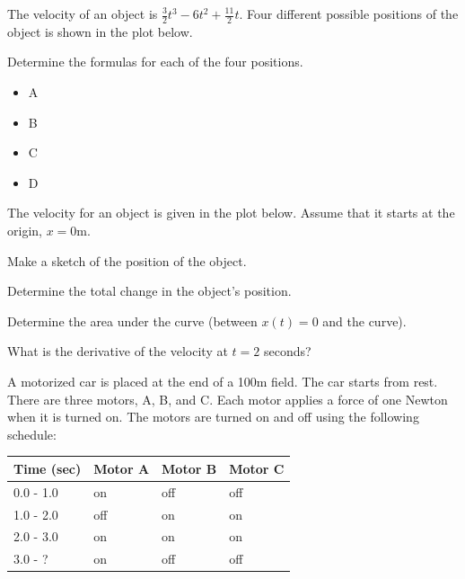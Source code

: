 \begin{problem}
\item The velocity of an object is
  $\frac{3}{2}t^3-6t^2+\frac{11}{2}t$. Four different possible
  positions of the object is shown in the plot below.

  \scalebox{0.7}{}

  \begin{subproblem}
    \item Determine the formulas for each of the four positions.
      \begin{itemize}
      \item A
        \vfill
      \item B
        \vfill
      \item C
        \vfill
      \item D
        \vfill
      \end{itemize}
  \end{subproblem}

  \clearpage

\item The velocity for an object is given in the plot below. Assume
  that it starts at the origin, $x=0$m.

  \scalebox{0.7}{}

  \begin{subproblem}
    \item Make a sketch of the position of the object.
    \item Determine the total change in the object's position.
      \vspace{2em}
    \item Determine the area under the curve (between $x(t)=0$ and the
      curve).
      \vspace{3em}
    \item What is the derivative of the velocity at $t=2$ seconds?
      \vspace{3em}
  \end{subproblem}

  \clearpage

\item A motorized car is placed at the end of a 100m field. The car
  starts from rest. There are three motors, A, B, and C. Each motor
  applies a force of one Newton when it is turned on. The motors are
  turned on and off using the following schedule: \\
  \begin{tabular}{l|lll}
    Time (sec) & Motor A & Motor B & Motor C \\ \hline
    0.0 - 1.0  & on      & off     & off     \\ 
    1.0 - 2.0  & off     & on      & on      \\ 
    2.0 - 3.0  & on      & on      & on      \\ 
    3.0 - ?    & on      & off     & off     
  \end{tabular}


\end{problem}

